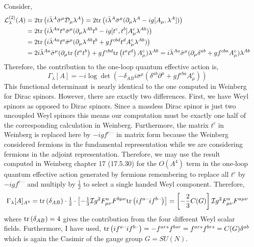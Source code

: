 \documentclass[12pt]{article}
\begin{document}
Consider,
\begin{align*}
\mathcal{L}^{(2)}_{\lambda}(A) & = 2 \mathrm{tr} \left(  i \bar{\lambda}^A \bar{\sigma}^\mu \mathcal{D}_\mu \lambda^A \right) = 2 \mathrm{tr} \left(  i \bar{\lambda}^A \bar{\sigma}^\mu ( \partial_\mu \lambda^A - i g [A_\mu, \lambda^A])   \right)
\\
& = 2 \mathrm{tr} \left(  i \bar{\lambda}^{Aa} t^a \bar{\sigma}^\mu ( \partial_\mu \lambda^{Ab} t^b - i g [t^c, t^b] A_\mu^c \lambda^{A b})   \right)
\\
& = 2 \mathrm{tr} \left(  i \bar{\lambda}^{Aa} t^a \bar{\sigma}^\mu ( \partial_\mu \lambda^{Ab} t^b + g f^{cbd} t^d A_\mu^c \lambda^{A b})   \right)
\\
& = 2 i \bar{\lambda}^{Aa} \bar{\sigma}^\mu   ( \partial_\mu \mathrm{tr} \left(  t^a t^b \right) + g f^{cbd} \mathrm{tr} \left( t^a t^d \right) A_\mu^c )  \lambda^{A b} = i \bar{\lambda}^{Aa} \bar{\sigma}^\mu   ( \partial_\mu \delta^{ab} + g f^{cba} A_\mu^c )  \lambda^{A b}
\end{align*} 
Therefore, the contribution to the one-loop quantum effective action is,
\[ \Gamma_\lambda[A] = - i \log{\det{(- \delta_{AB} i \bar{\sigma}^\mu (\delta^{ab} \partial^\mu + g f^{cba} A_\mu^c) )}} \]
This functional determinant is nearly identical to the one computed in Weinberg for Dirac spinors. However, there are exactly two differences. First, we have Weyl spinors as opposed to Dirac spinors. Since a massless Dirac spinor is just two uncoupled Weyl spinors this means our computation must be exactly one half of the corresponding calculation in Weinberg. Furthermore, the matrix $t^c$ in Weinberg is replaced here by $- i g f^{c\cdot \cdot}$ in matrix form because the Weinberg considered fermions in the fundamental representation while we are considering fermions in the adjoint representation. Therefore, we may use the result computed in Weinberg chapter 17 (17.5.30) for the $O(A^4)$ term in the one-loop quantum effective action generated by fermions remembering to replace all $t^c$ by $ -i g f^{c \cdot \cdot}$ and multiply by $\tfrac{1}{2}$ to select a single handed Weyl component. Therefore,
\[ \Gamma_\lambda[A]_{A^4} = \mathrm{tr} \left( \delta_{AB} \right) \cdot \tfrac{1}{2} \cdot \left[ - \tfrac{1}{3} \mathcal{I} g^2 F^a_{\mu \nu} F^{b \mu \nu} \mathrm{tr} \left( i f^{a \cdot \cdot} i f^{b \cdot \cdot} \right) \right] = \left[ - \frac{2}{3} C(G)  \right] \mathcal{I} g^2 F^a_{\mu \nu} F^{a \mu \nu} \]
where $\mathrm{tr} \left( \delta_{AB} \right) = 4$ gives the contribution from the four different Weyl scalar fields. Furthermore, I have used, $\mathrm{tr} \left( if^{a \cdot \cdot} i f^{b \cdot \cdot} \right) = - f^{ars} f^{bsr} = f^{ars} f^{brs} = C(G) \delta^{ab}$ which is again the Casimir of the gauge group $G = SU(N)$. 
\end{document}

